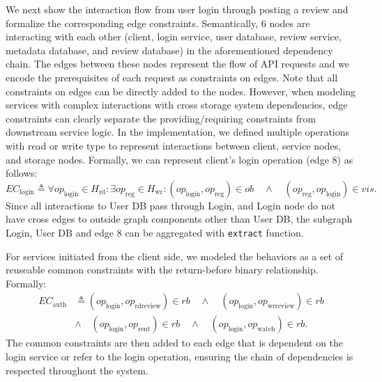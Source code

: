 We next show the interaction flow from user login through posting a review
and formalize the corresponding edge constraints.
Semantically, 6 nodes are interacting with each other (client,
  login service, user database, review service, metadata database,
and review database) in the aforementioned dependency chain.
The edges between these nodes represent the flow of API requests and we
encode the prerequisites of each request as constraints on edges.
Note that all constraints on edges can be
directly added to the nodes.
However, when modeling services with complex interactions 
with cross storage system dependencies, 
edge constraints can clearly
separate the providing/requiring constraints from downstream
service logic. In the implementation, we defined multiple operations
with read or write type to represent interactions between client,
service nodes, and storage nodes.
Formally, we can represent client's login operation (edge 8) as follows:
\[
  EC_{\text{login}} \triangleq \forall op_{\text{login}} \in H_{\text{rd}} : \exists op_{\text{reg}} \in H_{\text{wr}} :
  (op_{\text{login}}, op_{\text{reg}}) \in ob \quad \land \quad (op_{\text{reg}}, op_{\text{login}}) \in vis.
\]
Since all interactions to User DB pass through Login, and Login node do not have cross
edges to outside graph components other than User DB, the subgraph Login, User DB and
edge 8 can be aggregated with \texttt{extract} function.

For services initiated from the client side, we modeled the behaviors
as a set of reuseable common constraints with the return-before
binary relationship. Formally:
\begin{align*}
  EC_{\text{auth}} &\triangleq
  (op_{\text{login}}, op_{\text{rdreview}}) \in rb \quad \land \quad
  (op_{\text{login}}, op_{\text{wrreview}}) \in rb \\ 
	&\land \quad (op_{\text{login}}, op_{\text{rent}}) \in rb \quad \land \quad
  (op_{\text{login}}, op_{\text{watch}}) \in rb.
\end{align*}
The common constraints are then added to each edge that is dependent on the
login service or refer to the login operation, ensuring the chain
of dependencies is respected throughout the system.

